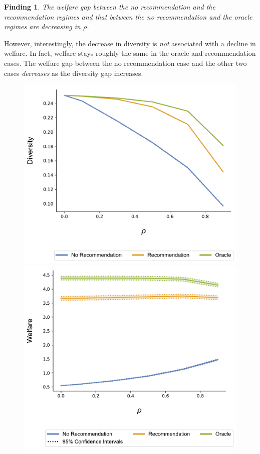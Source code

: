 \documentclass[sigconf, anonymous, review]{acmart}
\newtheorem{finding}{Finding}
\begin{document}
\begin{finding}\label{finding_welfare_gap}
The welfare gap between the no recommendation and the recommendation regimes and that between the no recommendation and the oracle regimes are decreasing in $\rho$.
\end{finding}
However, interestingly, the decrease in diversity is \textit{not} associated with a decline in welfare. In fact, welfare stays roughly the same in the oracle and recommendation cases. The welfare gap between the no recommendation case and the other two cases \textit{decreases} as the diversity gap increases.
\par
\begin{figure}[t]
\includegraphics[width=.9\linewidth]{figures/rho_diversity_N_200_T_20.pdf}\\
\includegraphics[width=.9\linewidth]{figures/rho_welfare_N_200_T_20.pdf}\\
\label{fig:diversity_correlation}
\end{figure}
\end{document}
